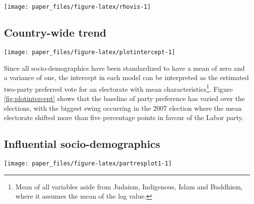\documentclass[times, doublespace]{anzsauth}
\let\rmarkdownfootnote\footnote%
\def\footnote{\protect\rmarkdownfootnote}
\let\origfigure\figure
\let\endorigfigure\endfigure
\renewenvironment{figure}[1][2] {
    \expandafter\origfigure\expandafter[htbp]
} {
    \endorigfigure
}
\begin{document}
\begin{figure}[h]

{\centering \texttt{[image: paper\_files/figure-latex/rhovis-1]} 

}

\caption{Estimates of the spatial autoregressive parameter for each of the six elections, reported with their individual 95\% confidence intervals. Only in 2001 and 2016 is there a significant spatial component.}\label{fig:rhovis}
\end{figure}

\hypertarget{country-wide-trend}{%
\subsection{Country-wide trend}\label{country-wide-trend}}

\begin{figure}[h]

{\centering \texttt{[image: paper\_files/figure-latex/plotintercept-1]} 

}

\caption{Estimated intercept for each election, which represents the two-party preferred vote for an electorate with mean characteristics.}\label{fig:plotintercept}
\end{figure}

Since all socio-demographics have been standardized to have a mean of zero and a variance of one, the intercept in each model can be interpreted as the estimated two-party preferred vote for an electorate with mean characteristics\footnote{Mean of all variables aside from Judaism, Indigenous, Islam and Buddhism, where it assumes the mean of the log value.}. Figure \ref{fig:plotintercept} shows that the baseline of party preference has varied over the elections, with the biggest swing occurring in the 2007 election where the mean electorate shifted more than five percentage points in favour of the Labor party.

\hypertarget{influential-socio-demographics}{%
\subsection{Influential socio-demographics}\label{influential-socio-demographics}}

\begin{figure}[h]

{\centering \texttt{[image: paper\_files/figure-latex/partresplot1-1]} 

}

\caption{Partial residual plots by election year for a selection of predictors. Linear model with 95\% confidence bands overlaid. Most predictors have a positive relationship: the larger the value the more likely the electorate preferences the Coalition. The relationship is relatively robust over time, with the exception of Unemployment.}\label{fig:partresplot1}
\end{figure}
\end{document}

